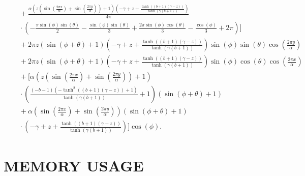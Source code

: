 \documentclass[ms,cpyr,lof,lot]{uathesis}
\begin{document}
\begin{align}
  &\quad + \frac{\alpha \left(z \left(\sin{\left (\frac{2 \pi x}{\alpha} \right )} + \sin{\left (\frac{2 \pi y}{\alpha} \right )}\right) + 1\right) \left(- \gamma + z + \frac{\tanh{\left (\left(b + 1\right) \left(\gamma - z\right) \right )}}{\tanh{\left (\gamma \left(b + 1\right) \right )}}\right)}{4 \pi} \nonumber\\
  &\quad \cdot \left(- \frac{\pi \sin{\left (\phi \right )} \sin{\left (\theta \right )}}{2} - \frac{\sin{\left(\phi\right)}\sin{\left(\theta\right)}}{3} + \frac{2 \pi \sin{\left (\phi \right )} \cos{\left (\theta \right )}}{3} - \frac{\cos{\left (\phi \right )}}{3} + 2 \pi\right) \Bigg] \nonumber\\
  &\quad + 2 \pi z \left(\sin{\left (\phi + \theta \right )} + 1\right) \left(- \gamma + z + \frac{\tanh{\left (\left(b + 1\right) \left(\gamma - z\right) \right )}}{\tanh{\left (\gamma \left(b + 1\right) \right )}}\right) \sin{\left (\phi \right )} \sin{\left (\theta \right )} \cos{\left (\frac{2 \pi y}{\alpha} \right )} \nonumber\\
  &\quad + 2 \pi z \left(\sin{\left (\phi + \theta \right )} + 1\right) \left(- \gamma + z + \frac{\tanh{\left (\left(b + 1\right) \left(\gamma - z\right) \right )}}{\tanh{\left (\gamma \left(b + 1\right) \right )}}\right) \sin{\left (\phi \right )} \cos{\left (\theta \right )} \cos{\left (\frac{2 \pi x}{\alpha} \right )} \nonumber\\
  &\quad + \Bigg[\alpha \left(z \left(\sin{\left (\frac{2 \pi x}{\alpha} \right )} + \sin{\left (\frac{2 \pi y}{\alpha} \right )}\right) + 1\right) \nonumber\\
  &\quad \cdot \left(\frac{\left(- b - 1\right) \left(- \tanh^{2}{\left (\left(b + 1\right) \left(\gamma - z\right) \right )} + 1\right)}{\tanh{\left (\gamma \left(b + 1\right) \right )}} + 1\right) %
  \left(\sin{\left (\phi + \theta \right )} + 1\right) \nonumber\\
  &\quad + \alpha \left(\sin{\left (\frac{2 \pi x}{\alpha} \right )} + \sin{\left (\frac{2 \pi y}{\alpha} \right )}\right) \left(\sin{\left (\phi + \theta \right )} + 1\right) \nonumber\\
  &\quad \cdot \left(- \gamma + z + \frac{\tanh{\left (\left(b + 1\right) \left(\gamma - z\right) \right )}}{\tanh{\left (\gamma \left(b + 1\right) \right )}}\right)\Bigg] \cos{\left (\phi \right )}.
  \label{eqn:mms_source_expr}
\end{align}

\chapter{MEMORY USAGE}
\label{chap:memory_usage}
\end{document}
